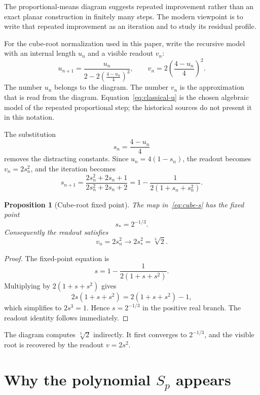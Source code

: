 \documentclass[10pt,a4paper]{article}
\theoremstyle{plain}
\newtheorem{proposition}[theorem]{Proposition}
\theoremstyle{definition}
\theoremstyle{remark}
\newcommand{\cbrt}[1]{\sqrt[3]{#1}}
\newenvironment{takeaway}{%
  \begin{center}\begin{minipage}{0.92\linewidth}\small\itshape\color{blue!45!black}%
}{%
  \end{minipage}\end{center}%
}
\begin{document}
The proportional-means diagram suggests repeated improvement rather than an
exact planar construction in finitely many steps.  The modern viewpoint is to
write that repeated improvement as an iteration and to study its residual
profile.

For the cube-root normalization used in this paper, write the recursive model with an internal
length $u_n$ and a visible readout $v_n$:
\begin{equation}
  u_{n+1}
  =\frac{u_n}{2-2\left(\frac{4-u_n}{4}\right)^3},
  \qquad
  v_n=2\left(\frac{4-u_n}{4}\right)^2.
  \label{eq:classical-u}
\end{equation}
The number $u_n$ belongs to the diagram.  The number $v_n$ is the approximation
that is read from the diagram.  Equation~\eqref{eq:classical-u} is the chosen
algebraic model of the repeated proportional step; the historical sources do
not present it in this notation.

The substitution
\[
  s_n=\frac{4-u_n}{4}
\]
removes the distracting constants.  Since $u_n=4(1-s_n)$, the readout becomes
$v_n=2s_n^2$, and the iteration becomes
\begin{equation}
  s_{n+1}
  =\frac{2s_n^2+2s_n+1}{2s_n^2+2s_n+2}
  =1-\frac{1}{2(1+s_n+s_n^2)}.
  \label{eq:cube-s}
\end{equation}

\begin{proposition}[Cube-root fixed point]
The map in~\eqref{eq:cube-s} has the fixed point
\[
  s_*=2^{-1/3}.
\]
Consequently the readout satisfies
\[
  v_n=2s_n^2 \longrightarrow 2s_*^2=\cbrt{2}.
\]
\end{proposition}

\begin{proof}
The fixed-point equation is
\[
  s=1-\frac{1}{2(1+s+s^2)}.
\]
Multiplying by $2(1+s+s^2)$ gives
\[
  2s(1+s+s^2)=2(1+s+s^2)-1,
\]
which simplifies to $2s^3=1$.  Hence $s=2^{-1/3}$ in the positive real branch.
The readout identity follows immediately.
\end{proof}

\begin{takeaway}
The diagram computes $\cbrt{2}$ indirectly.  It first converges to
$2^{-1/3}$, and the visible root is recovered by the readout $v=2s^2$.
\end{takeaway}

\section{Why the polynomial \texorpdfstring{$S_p$}{Sp} appears}
\label{sec:geometry}
\end{document}
